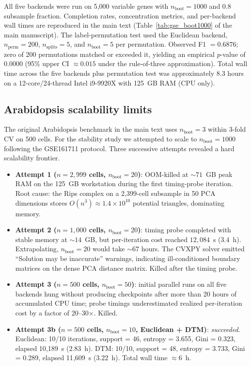 \documentclass[11pt]{article}
\begin{document}
All five backends were run on 5{,}000 variable genes with $n_{\text{boot}} = 1000$ and 0.8 subsample fraction.
Completion rates, concentration metrics, and per-backend wall times are reproduced in the main text (Table~\ref{tab:gse_boot1000} of the main manuscript).
The label-permutation test used the Euclidean backend, $n_{\text{perm}} = 200$, $n_{\text{splits}} = 5$, and $n_{\text{boot}} = 5$ per permutation.
Observed F1 $= 0.6876$; zero of 200 permutations matched or exceeded it, yielding an empirical $p$-value of $0.0000$ (95\% upper CI $\approx 0.015$ under the rule-of-three approximation).
Total wall time across the five backends plus permutation test was approximately 8.3 hours on a 12-core/24-thread Intel i9-9920X with 125~GB RAM (CPU only).

\subsection{Arabidopsis scalability limits}

The original Arabidopsis benchmark in the main text uses $n_{\text{boot}} = 3$ within 3-fold CV on 500 cells.
For the stability study we attempted to scale to $n_{\text{boot}} = 1000$ following the GSE161711 protocol.
Three successive attempts revealed a hard scalability frontier.

\begin{itemize}
\item \textbf{Attempt 1 ($n = 2{,}999$ cells, $n_{\text{boot}} = 20$)}: OOM-killed at $\sim 71$~GB peak RAM on the 125~GB workstation during the first timing-probe iteration. Root cause: the Rips complex on a 2{,}399-cell subsample in 50 PCA dimensions stores $O(n^3) \approx 1.4 \times 10^{10}$ potential triangles, dominating memory.

\item \textbf{Attempt 2 ($n = 1{,}000$ cells, $n_{\text{boot}} = 20$)}: timing probe completed with stable memory at $\sim 14$~GB, but per-iteration cost reached $12{,}084$~s ($3.4$~h). Extrapolating, $n_{\text{boot}} = 20$ would take $\sim 67$ hours. The CVXPY solver emitted ``Solution may be inaccurate'' warnings, indicating ill-conditioned boundary matrices on the dense PCA distance matrix. Killed after the timing probe.

\item \textbf{Attempt 3 ($n = 500$ cells, $n_{\text{boot}} = 50$)}: initial parallel runs on all five backends hung without producing checkpoints after more than 20 hours of accumulated CPU time; probe timings underestimated realized per-iteration cost by a factor of 20--30$\times$. Killed.

\item \textbf{Attempt 3b ($n = 500$ cells, $n_{\text{boot}} = 10$, Euclidean + DTM)}: \emph{succeeded}. Euclidean: 10/10 iterations, support = 46, entropy = 3.655, Gini = 0.323, elapsed 10{,}189~s ($2.83$~h). DTM: 10/10, support = 48, entropy = 3.733, Gini = 0.289, elapsed 11{,}609~s ($3.22$~h). Total wall time $\approx 6$~h.
\end{itemize}
\end{document}
